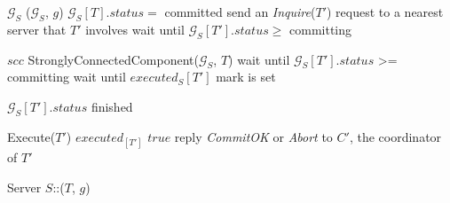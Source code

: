 \begin{algorithm}
  \DontPrintSemicolon
  $\mathcal{G}_S$ ($\mathcal{G}_S$, $g$) \;
  $\mathcal{G}_S[T].status = $ {\sf committed} \;
   { \label{line:wait_commit_begin}
     {
       {
        send an \emph{Inquire}($T'$) request to a nearest server
        that $T'$ involves \;
      }
      wait until $\mathcal{G}_S[T'].status \ge$ {\sf committing} \;
    }
  } \label{line:wait_commit_end}

  $scc$ {\LAR} {\sc StronglyConnectedComponent}($\mathcal{G}_S$, $T$) \;
   {
    wait until $\mathcal{G}_S[T'].status$ >= {\sf committing} \;
     {
      wait until $executed_S[T']$ mark is set \;
    }
  }

   {
    $\mathcal{G}_S[T'].status$ {\LAR} {\sf finished} \;

    
     {
       {
        Execute($T'$) \;
      }
      $executed_[T']$ \LAR $true$ \;
      reply \emph{CommitOK} or \emph{Abort} to $C'$, the coordinator of $T'$ \;
    }
  }
  \caption{Server $S$::($T$, $g$)}
\end{algorithm}


